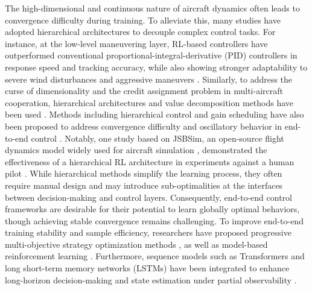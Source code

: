 \documentclass[pdflatex,sn-mathphys-num]{sn-jnl}%
\theoremstyle{thmstyleone}%
\theoremstyle{thmstyletwo}%
\theoremstyle{thmstylethree}%
\begin{document}
The high-dimensional and continuous nature of aircraft dynamics often leads to convergence difficulty during training. To alleviate this, many studies have adopted hierarchical architectures to decouple complex control tasks. For instance, at the low-level maneuvering layer, RL-based controllers have outperformed conventional proportional-integral-derivative (PID) controllers in response speed and tracking accuracy, while also showing stronger adaptability to severe wind disturbances and aggressive maneuvers \cite{koch_reinforcement_2019, bohn_data-efficient_2023, oconnell_neural-fly_2022, clarke_deep_2020, clarke_reinforcement_2023}. Similarly, to address the curse of dimensionality and the credit assignment problem in multi-aircraft cooperation, hierarchical architectures and value decomposition methods have been used \cite{chai_hierarchical_2022, wang_hierarchical_2023, feng_autonomous_2023, selmonaj_hierarchical_2023}. Methods including hierarchical control and gain scheduling have also been proposed to address convergence difficulty and oscillatory behavior in end-to-end control \cite{chen_physics-informed_2026}. Notably, one study based on JSBSim, an open-source flight dynamics model widely used for aircraft simulation \cite{jsbsim}, demonstrated the effectiveness of a hierarchical RL architecture in experiments against a human pilot \cite{pope_hierarchical_2023}. While hierarchical methods simplify the learning process, they often require manual design and may introduce sub-optimalities at the interfaces between decision-making and control layers. Consequently, end-to-end control frameworks are desirable for their potential to learn globally optimal behaviors, though achieving stable convergence remains challenging. To improve end-to-end training stability and sample efficiency, researchers have proposed progressive multi-objective strategy optimization methods \cite{li_progressive_2025}, as well as model-based reinforcement learning \cite{GIRAL2026110985}. Furthermore, sequence models such as Transformers and long short-term memory networks (LSTMs) have been integrated to enhance long-horizon decision-making and state estimation under partial observability \cite{yu_hybrid_2025, yang_close-range_2025, hsu_scalable_2021, bae_deep_2023}. 
\end{document}
